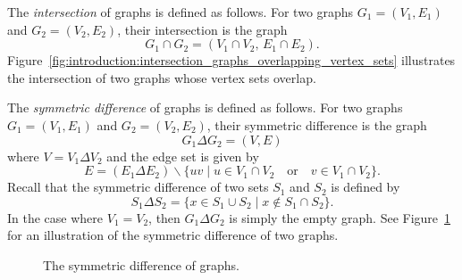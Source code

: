 The \emph{intersection} of graphs is defined
as follows. For two graphs $G_1 = (V_1, E_1)$ and $G_2 = (V_2, E_2)$,
their intersection is the graph
\[
G_1 \cap G_2
=
(V_1 \cap V_2,\, E_1 \cap E_2).
\]
Figure~\ref{fig:introduction:intersection_graphs_overlapping_vertex_sets}
illustrates the intersection of two graphs whose vertex sets overlap.

The \emph{symmetric difference} of graphs
is defined as follows. For two graphs $G_1 = (V_1, E_1)$ and
$G_2 = (V_2, E_2)$, their symmetric difference is the graph
\[
G_1 \Delta G_2
=
(V, E)
\]
where $V = V_1 \Delta V_2$\index{$\Delta$} and the edge set is given
by
\[
E
=
(E_1 \Delta E_2) \backslash
\{
uv \;|\; u \in V_1 \cap V_2 \quad\text{or}\quad v \in V_1 \cap V_2
\}.
\]
Recall that the symmetric difference of two sets $S_1$ and $S_2$ is
defined by
\[
S_1 \Delta S_2
=
\{x \in S_1 \cup S_2 \;|\; x \notin S_1 \cap S_2\}.
\]
In the case where $V_1 = V_2$, then $G_1 \Delta G_2$ is simply the
empty graph. See Figure~\ref{fig:introduction:symmetric_difference}
for an illustration of the symmetric difference of two graphs.

\begin{figure}[!htbp]
\centering
{}
\qquad
{}
\qquad
{}
\caption{The symmetric difference of graphs.}
\label{fig:introduction:symmetric_difference}
\end{figure}

